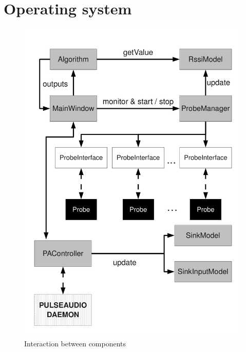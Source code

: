 \documentclass[conference]{IEEEtran}
\begin{document}

\section{Operating system}

\begin{figure}
\centering
\includegraphics[scale = 0.3]{architettura.pdf}
\caption{Interaction between components}
\label{arch}
\end{figure}
\end{document}
